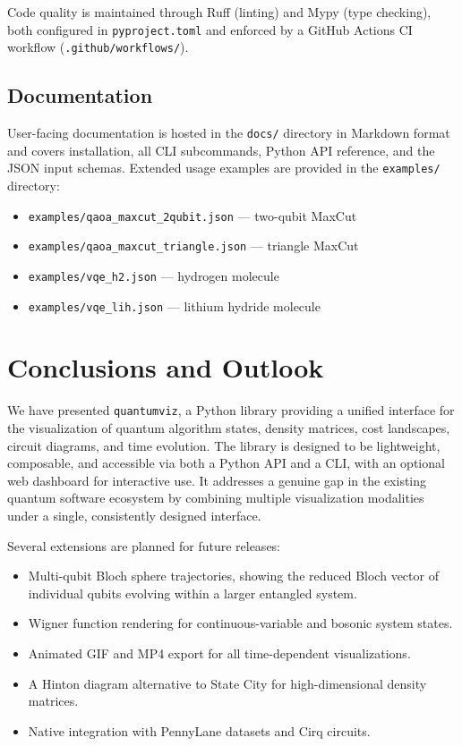 \documentclass{SciPost}
\begin{document}
Code quality is maintained through Ruff (linting) and Mypy (type checking),
both configured in \texttt{pyproject.toml} and enforced by a GitHub Actions
CI workflow (\texttt{.github/workflows/}).

\subsection{Documentation}

User-facing documentation is hosted in the \texttt{docs/} directory in
Markdown format and covers installation, all CLI subcommands, Python API
reference, and the JSON input schemas.
Extended usage examples are provided in the \texttt{examples/} directory:
\begin{itemize}
  \item \texttt{examples/qaoa\_maxcut\_2qubit.json} --- two-qubit MaxCut
  \item \texttt{examples/qaoa\_maxcut\_triangle.json} --- triangle MaxCut
  \item \texttt{examples/vqe\_h2.json} --- hydrogen molecule
  \item \texttt{examples/vqe\_lih.json} --- lithium hydride molecule
\end{itemize}

\section{Conclusions and Outlook}
\label{sec:conclusions}

We have presented \texttt{quantumviz}, a Python library providing a unified
interface for the visualization of quantum algorithm states, density matrices,
cost landscapes, circuit diagrams, and time evolution.
The library is designed to be lightweight, composable, and accessible via
both a Python API and a CLI, with an optional web dashboard for interactive
use.
It addresses a genuine gap in the existing quantum software ecosystem by
combining multiple visualization modalities under a single, consistently
designed interface.

Several extensions are planned for future releases:
\begin{itemize}
  \item Multi-qubit Bloch sphere trajectories, showing the reduced Bloch
        vector of individual qubits evolving within a larger entangled system.
  \item Wigner function rendering for continuous-variable and bosonic system
        states.
  \item Animated GIF and MP4 export for all time-dependent visualizations.
  \item A Hinton diagram alternative to State City for high-dimensional
        density matrices.
  \item Native integration with PennyLane datasets and Cirq circuits.
\end{itemize}
\end{document}
